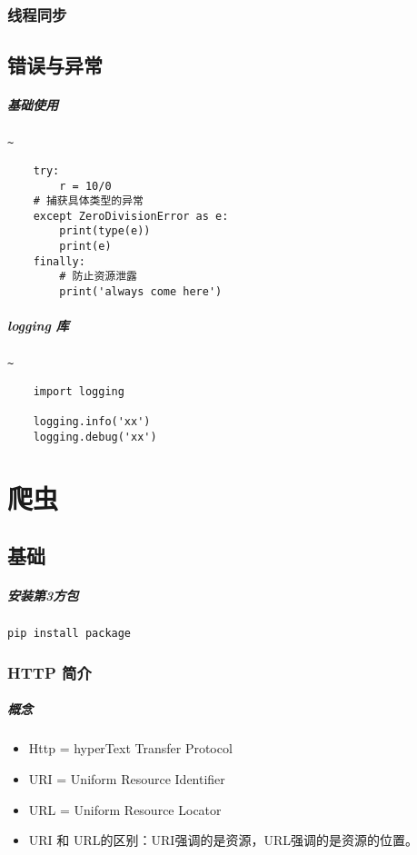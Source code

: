 \documentclass[UTF8,a4paper,12pt]{ctexbook}
\begin{document}
		\subsection{线程同步}

		
	\section{错误与异常}
		\paragraph{基础使用}\verb_~_
			\begin{lstlisting}
	try:
		r = 10/0
	# 捕获具体类型的异常
	except ZeroDivisionError as e:
		print(type(e))
		print(e)
	finally:
		# 防止资源泄露
		print('always come here')
			\end{lstlisting}
		
		\paragraph{logging 库}\verb_~_
			\begin{lstlisting}
	import logging
	
	logging.info('xx')
	logging.debug('xx')
			\end{lstlisting}	
		

\chapter{爬虫}
	\section{基础}
		\paragraph{安装第3方包}\verb|pip install package|
		
		\subsection{HTTP 简介}
			\paragraph{概念}
				\begin{itemize}
					\item Http = hyperText Transfer Protocol
					\item URI = Uniform Resource Identifier
					\item URL = Uniform Resource Locator
					\item URI 和 URL的区别：URI强调的是资源，URL强调的是资源的位置。
				\end{itemize}
			
\end{document}
